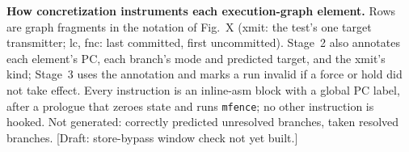 \textbf{How concretization instruments each execution-graph element.} Rows are graph fragments in the notation of Fig.~X (xmit: the test's one target transmitter; lc, fnc: last committed, first uncommitted). Stage~2 also annotates each element's PC, each branch's mode and predicted target, and the xmit's kind; Stage~3 uses the annotation and marks a run invalid if a force or hold did not take effect. Every instruction is an inline-asm block with a global PC label, after a prologue that zeroes state and runs \texttt{mfence}; no other instruction is hooked. Not generated: correctly predicted unresolved branches, taken resolved branches. [Draft: store-bypass window check not yet built.]
